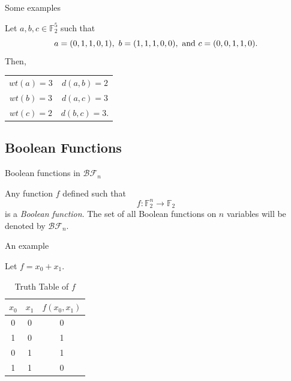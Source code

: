 \documentclass{beamer}
\def\gftwo{\mathbb{F}_2}
\def\BF{\mathcal{BF}}
\begin{document}
\begin{frame}{Some examples}
  \begin{example}
  	Let $a,b,c\in\gftwo^5$ such that
  	\[
  	a=(0,1,1,0,1),\ b=(1,1,1,0,0),\ {\rm and}\ c=(0,0,1,1,0).
  	\]
  	Then,
  	\begin{center}
  		\begin{tabular}{c c}
  			$wt(a)=3$&$d(a,b)=2$\\
  			$wt(b)=3$&$d(a,c)=3$\\
  			$wt(c)=2$&$d(b,c)=3$.\\
  		\end{tabular}
  	\end{center}
  \end{example}
\end{frame}

\subsection{Boolean Functions}
\begin{frame}{Boolean functions in $\BF_n$}
  \begin{definition}
  \label{def:boolean-function}
    Any function $f$ defined such that 
    \begin{equation*}
      f:\gftwo^n\rightarrow\gftwo
    \end{equation*}
    is a {\em Boolean function}. The set of all Boolean functions on $n$
    variables will be denoted by $\BF_n$.
  \end{definition}
\end{frame}

\begin{frame}{An example}
  \begin{example}
    Let $f=x_0+x_1$.
    \begin{table}
    \label{tab:truth-table}
    	\centering
      \begin{tabular}{|c|c||c|}
        \hline
        $x_0$&$x_1$&$f(x_0,x_1)$\\
        \hline
        0&0&0\\
        1&0&1\\
        0&1&1\\
        1&1&0\\
      	\hline
    	\end{tabular}
    	\caption{Truth Table of $f$}
    \end{table}
  \end{example}
\end{frame}
\end{document}
